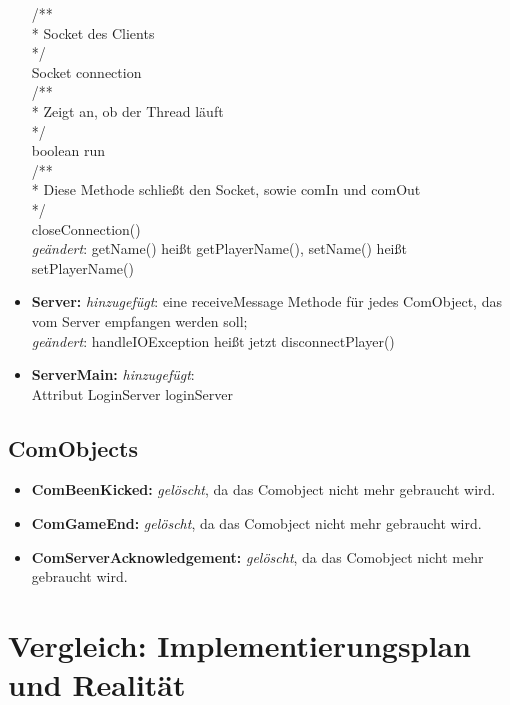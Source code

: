 \documentclass{article}
\begin{document}
\begin{itemize}
/**\\
 * Socket des Clients\\
 */\\
Socket connection\\
/**\\
 * Zeigt an, ob der Thread läuft\\
 */\\
boolean run\\
/**\\
 * Diese Methode schließt den Socket, sowie comIn und comOut\\
 */\\
closeConnection()\\

\textit{geändert}: getName() heißt getPlayerName(), setName() heißt setPlayerName()
\\
\item  \textbf{Server:} \textit{hinzugefügt}: eine receiveMessage Methode für jedes ComObject, das vom Server empfangen werden soll; \\
\textit{geändert}: handleIOException heißt jetzt disconnectPlayer()
\\
\item  \textbf{ServerMain:} \textit{hinzugefügt}:\\
 Attribut LoginServer loginServer\\
\end{itemize}

\subsection{ComObjects}

\begin{itemize}
\item \textbf{ComBeenKicked:} \textit{gelöscht}, da das Comobject nicht mehr gebraucht wird.\\
\item \textbf{ComGameEnd:} \textit{gelöscht}, da das Comobject nicht mehr gebraucht wird.\\
\item \textbf{ComServerAcknowledgement:} \textit{gelöscht}, da das Comobject nicht mehr gebraucht wird.\\

\end{itemize}

\newpage

\section{Vergleich: Implementierungsplan und Realität}
\end{document}
